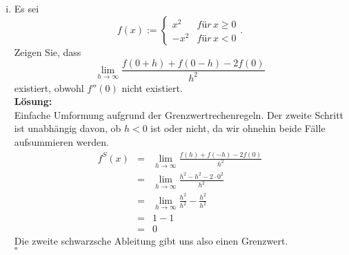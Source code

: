 \documentclass[11pt,a4paper,ngerman]{article}
\begin{document}
\begin{enumerate}[(i)]
    \item Es sei
        $$
            f(x) := \left\{ \begin{array}{lr} x^2 & für \, x\geq 0 \\ -x^2 & für \, x<0\end{array}\right. .
        $$
        Zeigen Sie, dass
        $$
            \underset{h \rightarrow \infty}{\lim} \frac{f(0+h) + f(0-h) - 2f(0)}{h^2}
        $$
        existiert, obwohl $f''(0)$ nicht existiert.\\
    \textbf{Lösung:}\\
        Einfache Umformung aufgrund der Grenzwertrechenregeln. Der zweite Schritt ist unabhängig
        davon, ob $h<0$ ist oder nicht, da wir ohnehin beide Fälle aufsummieren werden.
        $$\begin{array}{rcl}
            f^S(x) &=& \underset{h \rightarrow \infty}{\lim} \frac{f(h) + f(-h) - 2f(0)}{h^2}\\
                &=& \underset{h \rightarrow \infty}{\lim} \frac{h^2 - h^2 -2\cdot 0^2}{h^2}\\
                &=& \underset{h \rightarrow \infty}{\lim} \frac{h^2}{h^2} - \frac{h^2}{h^2}\\
                &=& 1 - 1\\
                &=& 0
        \end{array}$$
        Die zweite schwarzsche Ableitung gibt uns also einen Grenzwert.\\
        \mbox{} \hfill $\square$


\end{enumerate}
\end{document}
